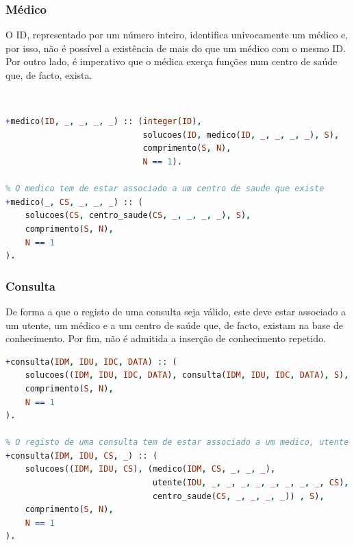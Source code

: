 \documentclass[a4paper, 11pt]{article}
\begin{document}
\subsubsection*{Médico}

O ID, representado por um número inteiro, identifica univocamente um médico e, por isso, não é possível a existência de
mais do que um médico com o mesmo ID. Por outro lado, é imperativo que o médica exerça funções num centro de saúde que,
de facto, exista.

\

\begin{lstlisting}[language=Prolog, caption={Invariantes de inserção relativos ao predicado \texttt{medico}}]
% O ID do medico deve ser um numero inteiro e este deve ser unico
+medico(ID, _, _, _, _) :: (integer(ID),
                            solucoes(ID, medico(ID, _, _, _, _), S),
                            comprimento(S, N),
                            N == 1).

% O medico tem de estar associado a um centro de saude que existe
+medico(_, CS, _, _, _) :: (
    solucoes(CS, centro_saude(CS, _, _, _, _), S),
    comprimento(S, N),
    N == 1
).
\end{lstlisting}

\subsubsection*{Consulta}

De forma a que o registo de uma consulta seja válido, este deve estar associado a um utente, um médico e a um centro de
saúde que, de facto, existam na base de conhecimento. Por fim, não é admitida a inserção de conhecimento repetido.

\pagebreak

\begin{lstlisting}[language=Prolog, caption={Invariantes de inserção relativos ao predicado \texttt{consulta}}]
% Nao permite a insercao de registos duplicados
+consulta(IDM, IDU, IDC, DATA) :: (
    solucoes((IDM, IDU, IDC, DATA), consulta(IDM, IDU, IDC, DATA), S),
    comprimento(S, N),
    N == 1
).

% O registo de uma consulta tem de estar associado a um medico, utente e centro de saude que existam
+consulta(IDM, IDU, CS, _) :: (
    solucoes((IDM, IDU, CS), (medico(IDM, CS, _, _, _),
                              utente(IDU, _, _, _, _, _, _, _, _, CS),
                              centro_saude(CS, _, _, _, _)) , S),
    comprimento(S, N),
    N == 1
).
\end{lstlisting}
\end{document}
